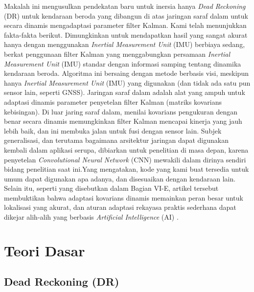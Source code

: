 Makalah ini mengusulkan pendekatan baru untuk inersia hanya \emph{Dead Reckoning} (DR) untuk kendaraan beroda yang dibangun di atas jaringan saraf dalam untuk secara dinamis mengadaptasi parameter filter Kalman. Kami telah menunjukkan fakta-fakta berikut. Dimungkinkan untuk mendapatkan 
hasil yang sangat akurat hanya dengan menggunakan \emph{Inertial Measurement Unit} (IMU) berbiaya sedang, berkat penggunaan filter Kalman yang menggabungkan persamaan \emph{Inertial Measurement Unit} (IMU) 
standar dengan informasi samping tentang dinamika kendaraan beroda. Algoritma ini bersaing dengan metode berbasis visi, meskipun hanya \emph{Inertial Measurement Unit} (IMU) 
yang digunakan (dan tidak ada satu pun sensor lain, seperti GNSS). Jaringan saraf dalam adalah alat yang ampuh untuk adaptasi dinamis parameter penyetelan filter Kalman (matriks kovarians kebisingan). 
Di luar jaring saraf dalam, menilai kovarians pengukuran dengan benar secara dinamis memungkinkan filter Kalman mencapai kinerja yang jauh lebih baik, dan ini membuka jalan untuk fusi dengan sensor lain. 
Subjek generalisasi, dan terutama bagaimana arsitektur jaringan dapat digunakan kembali dalam aplikasi serupa, dibiarkan untuk penelitian di masa depan, karena penyetelan \emph{Convolutional Neural Network} (CNN) 
mewakili dalam dirinya sendiri bidang penelitian saat ini.Yang mengatakan, kode yang kami buat tersedia untuk umum dapat digunakan apa adanya, dan disesuaikan dengan kendaraan lain. 
Selain itu, seperti yang disebutkan dalam Bagian VI-E, artikel tersebut membuktikan bahwa adaptasi kovarians dinamis memainkan peran besar untuk lokalisasi yang akurat, 
dan aturan adaptasi rekayasa praktis sederhana dapat dikejar alih-alih yang berbasis \emph{Artificial Intelligence} (AI) \parencite{Brossard2020}.

\section{Teori Dasar}

\subsection{Dead Reckoning (DR)}

